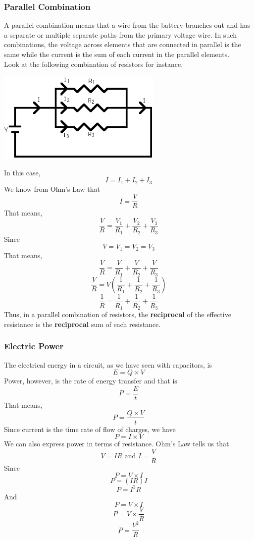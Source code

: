 \documentclass[9pt,addpoints]{exam}
\begin{document}
\subsubsection*{Parallel Combination}
A parallel combination means that a wire from the battery branches out and has a separate or multiple separate paths from the primary voltage wire. In such combinations, the voltage across elements that are connected in parallel is the same while the current is the sum of each current in the parallel elements.\\
Look at the following combination of resistors for instance, 
\begin{center}
\includegraphics[scale=0.5]{parallel_resistors.png}	
\end{center}
In this case,
$$I = I_1 + I_2 + I_3$$
We know from Ohm's Law that
$$I = \frac{V}{R}$$ 
That means,
$$\frac{V}{R} = \frac{V_1}{R_1} + \frac{V_2}{R_2} +\frac{V_3}{R_3}$$	
Since
$$V = V_1 = V_2 = V_3$$
That means,
$$\frac{V}{R} = \frac{V}{R_1} + \frac{V}{R_2} +\frac{V}{R_3}$$
$$\frac{V}{R} = V(\frac{1}{R_1} + \frac{1}{R_2} +\frac{1}{R_3})$$
$$\frac{1}{R} = \frac{1}{R_1} + \frac{1}{R_2} +\frac{1}{R_3}$$
Thus, in a parallel combination of resistors, the \textbf{reciprocal} of the effective resistance is the \textbf{reciprocal} sum of each resistance.
\subsubsection*{Electric Power}
The electrical energy in a circuit, as we have seen with capacitors, is
$$E = Q \times V$$
Power, however, is the rate of energy transfer and that is
$$P= \frac{E}{t}$$
That means,
$$P = \frac{Q \times V}{t} $$
Since current is the time rate of flow of charges, we have
$$P = I\times V$$
We can also express power in terms of resistance. Ohm's Law tells us that
$$V = IR \text{ and } I=\frac{V}{R}$$
Since
$$ P = V\times I$$
$$ P = (IR)I$$
$$ P = I^2R$$
And
$$ P = V\times I$$
$$ P = V\times \frac{V}{R}$$
$$ P= \frac{V^2}{R}$$
\end{document}
